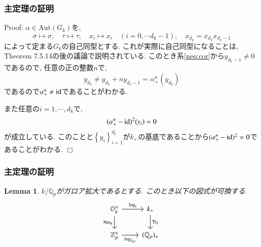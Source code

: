 \documentclass[dvipdfmx,19.8pt]{beamer}
\newcommand{\Blue}{\color{blue}}
\def\qed{\hfill $\Box$}
\theoremstyle{theorem}
\newtheorem{lem}[theorem]{Lemma}
\theoremstyle{definition}
\def\bZ{{\mathbb Z}}
\def\bQ{{\mathbb Q}}
\def\Aut{{\mathrm{Aut}}}
\begin{document}
\begin{frame}[fragile]
	\frametitle{主定理の証明}
{\Blue Proof:}
$\alpha \in \Aut(G_k)$を, 
\[
\sigma \mapsto \sigma, \quad \tau \mapsto \tau, \quad x_i \mapsto x_i \quad (i= 0, \cdots d_k -1), \quad x_{d_k} = x_{d_k} x_{d_k-1}
\]
によって定まる$G_k$の自己同型とする. これが実際に自己同型になることは\cite{NSW}, Theorem 7.5.14の後の議論で説明されている. このとき系\ref{neq:cor}から$y_{d_k -1} \neq 0$であるので, 任意の正の整数$n$で, 
\[
y_{d_k} \neq y_{d_k} + n y_{d_k -1} = \alpha_+^n(y_{d_k}) 
\]
であるので$\alpha_+^n \neq {\rm id}$であることがわかる. 

また任意の$i=1, \cdots, d_k$で, 
\[
(\alpha^n_+ - {\rm id})^2 (y_i) = 0
\]
が成立している. このことと$\left\{y_i \right\}_{i=1}^{d_k}$が$k_+$の基底であることから$(\alpha^n_+ - {\rm id})^2 = 0$であることがわかる. 
\qed

\end{frame}







\begin{frame}[fragile]
	\frametitle{主定理の証明}

\begin{lem}\label{lemma:new:2.2}
$k/\bQ_p$がガロア拡大であるとする. このとき以下の図式が可換する. 
\[
\begin{tikzcd}
\mathcal{O}_k^\times \arrow[r, "{\log}_k"] \arrow[d, "{\rm Nm}_k"'] & k_+ \arrow[d, "{\rm Tr}_k"] \\
\bZ_p^\times \arrow[r, "{\log}_{\bQ_p}"']                              & (\bQ_p)_+             
\end{tikzcd}
\]
\end{lem}


\end{frame}
\end{document}
